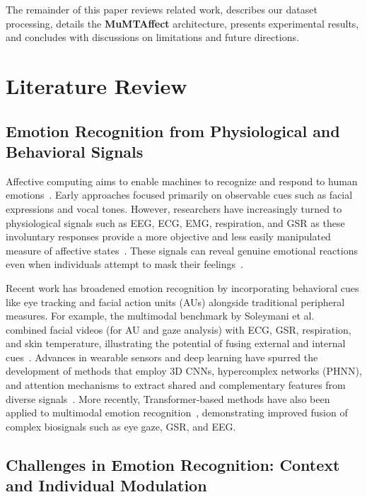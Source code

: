 \documentclass[sigconf]{acmart}
\begin{document}
The remainder of this paper reviews related work, describes our dataset processing, details the \textbf{MuMTAffect} architecture, presents experimental results, and concludes with discussions on limitations and future directions.


\section{Literature Review}
\label{sec:lit_review}

\subsection*{Emotion Recognition from Physiological and Behavioral Signals}

Affective computing aims to enable machines to recognize and respond to human emotions~\cite{Picard1997}. Early approaches focused primarily on observable cues such as facial expressions and vocal tones. However, researchers have increasingly turned to physiological signals such as EEG, ECG, EMG, respiration, and GSR as these involuntary responses provide a more objective and less easily manipulated measure of affective states~\cite{Li2018}. These signals can reveal genuine emotional reactions even when individuals attempt to mask their feelings~\cite{Li2018}.

Recent work has broadened emotion recognition by incorporating behavioral cues like eye tracking and facial action units (AUs) alongside traditional peripheral measures. For example, the multimodal benchmark by Soleymani et al.~\cite{Soleymani2012} combined facial videos (for AU and gaze analysis) with ECG, GSR, respiration, and skin temperature, illustrating the potential of fusing external and internal cues~\cite{Koelstra2012,Subramanian2016}. Advances in wearable sensors and deep learning have spurred the development of methods that employ 3D CNNs, hypercomplex networks (PHNN), and attention mechanisms to extract shared and complementary features from diverse signals~\cite{Lv2022,Ju2024,Wang2024}. More recently, Transformer-based methods have also been applied to multimodal emotion recognition~\cite{Vazquez2022,Sawant2023}, demonstrating improved fusion of complex biosignals such as eye gaze, GSR, and EEG.

\subsection*{Challenges in Emotion Recognition: Context and Individual Modulation}
\end{document}
